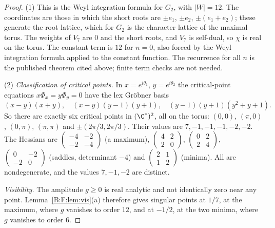 \documentclass[11pt,a4paper]{article}
\theoremstyle{definition}
\theoremstyle{remark}
\numberwithin{equation}{section}
\begin{document}
\begin{proof}
(1) This is the Weyl integration formula for $G_2$, with $|W|=12$. The
coordinates are those in which the short roots are $\pm e_1$, $\pm e_2$,
$\pm(e_1+e_2)$; these generate the root lattice, which for $G_2$ is the
character lattice of the maximal torus. The weights of $V_7$ are $0$ and the
short roots, and $V_7$ is self-dual, so $\chi$ is real on the torus. The constant term is $12$ for $n=0$, also forced by the Weyl integration formula applied to the constant function. The recurrence for all $n$ is the published theorem cited above; finite term checks are not needed.

(2) \emph{Classification of critical points.} In $x=e^{i\theta_1}$,
$y=e^{i\theta_2}$ the critical-point equations $x\Phi_x=y\Phi_y=0$ have the
lex Gr\"obner basis
\[
 (x-y)(x+y),\quad (x-y)(y-1)(y+1),\quad (y-1)(y+1)(y^2+y+1).
\]
So there are exactly six critical points in $(\C^*)^2$, all on the torus:
$(0,0)$, $(\pi,0)$, $(0,\pi)$, $(\pi,\pi)$ and $\pm(2\pi/3,2\pi/3)$. Their
values are $7,-1,-1,-1,-2,-2$. The Hessians are
$\left(\begin{smallmatrix}-4&-2\\-2&-4\end{smallmatrix}\right)$ (a maximum),
$\left(\begin{smallmatrix}4&2\\2&0\end{smallmatrix}\right)$,
$\left(\begin{smallmatrix}0&2\\2&4\end{smallmatrix}\right)$,
$\left(\begin{smallmatrix}0&-2\\-2&0\end{smallmatrix}\right)$ (saddles,
determinant $-4$) and
$\left(\begin{smallmatrix}2&1\\1&2\end{smallmatrix}\right)$ (minima). All
are nondegenerate, and the values $7,-1,-2$ are distinct.

\emph{Visibility.} The amplitude $g\ge0$ is real analytic and not
identically zero near any point. Lemma~\ref{B:F:lem:vis}(a) therefore gives
singular points at $1/7$, at the maximum, where $g$ vanishes to order $12$,
and at $-1/2$, at the two minima, where $g$ vanishes to order $6$.


\end{proof}
\end{document}
